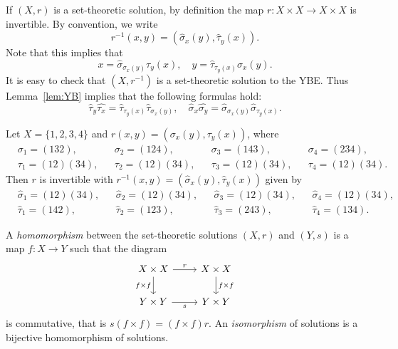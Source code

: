 If $(X,r)$ is a set-theoretic solution, by definition the map $r\colon X\times X\to X\times X$ is 
invertible. By convention, we write 
 \[
 r^{-1}(x,y)=(\widehat{\sigma}_x(y),\widehat{\tau}_y(x)).
 \]
 Note that this implies that
 \[
 x=\widehat{\sigma}_{\sigma_x(y)}\tau_y(x),\quad
 y=\widehat{\tau}_{\tau_y(x)}\sigma_x(y).
 \]
 It is easy to check that $(X,r^{-1})$ is a set-theoretic solution to the YBE. Thus Lemma~\ref{lem:YB} implies that 
 the following formulas hold:
 \[
 \widehat{\tau}_y\widehat{\tau_x}=\widehat{\tau}_{\tau_y(x)}\widehat{\tau}_{\sigma_x(y)},
 \quad
 \widehat{\sigma}_x\widehat{\sigma_y}=\widehat{\sigma}_{\sigma_x(y)}\widehat{\sigma}_{\tau_y(x)}.
 \]

\begin{example}
Let $X=\{1,2,3,4\}$ and $r(x,y)=(\sigma_x(y),\tau_y(x))$, where
\begin{align*}
&\sigma_1=(132),&&
\sigma_2=(124),&&
\sigma_3=(143),&&
\sigma_4=(234),\\
&\tau_1=(12)(34),&&
\tau_2=(12)(34),&&
\tau_3=(12)(34),&&
\tau_4=(12)(34).
\end{align*}
Then $r$ is invertible with $r^{-1}(x,y)=(\widehat{\sigma}_x(y),\widehat{\tau}_y(x))$ given by
\begin{align*}
&\widehat{\sigma}_1=(12)(34), &&
\widehat{\sigma}_2=(12)(34), &&
\widehat{\sigma}_3=(12)(34), &&
\widehat{\sigma}_4=(12)(34),\\
&\widehat{\tau}_1=(142),&&
\widehat{\tau}_2=(123),&&
\widehat{\tau}_3=(243),&&
\widehat{\tau}_4=(134).
\end{align*}
\end{example}

\begin{definition}
A \emph{homomorphism} between the set-theoretic solutions $(X,r)$ and
$(Y,s)$ is a map $f\colon X\to Y$ such that the diagram 
\[\begin{tikzcd}
	{X\times X} & {X\times X} \\
	{Y\times Y} & {Y\times Y}
	\arrow["r", from=1-1, to=1-2]
	\arrow["{f\times f}"', from=1-1, to=2-1]
	\arrow["{f\times f}", from=1-2, to=2-2]
	\arrow["s"', from=2-1, to=2-2]
\end{tikzcd}
\]
is commutative, that is $s (f\times f)=(f\times f) r$. An \emph{isomorphism} of solutions is a bijective
homomorphism of solutions.
\end{definition}

